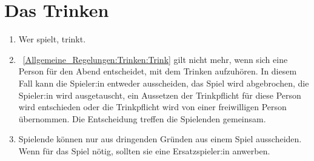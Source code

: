 \section{Das Trinken}
\begin{enumerate}[label={(\arabic*)}]
	\item\label{Allgemeine_Regelungen:Trinken:Trink}
	Wer spielt, trinkt.
	
	\item
~\ref{Allgemeine_Regelungen:Trinken:Trink} gilt nicht mehr, wenn sich eine Person für den Abend entscheidet, mit dem Trinken aufzuhören.
	In diesem Fall kann die Spieler:in entweder ausscheiden, das Spiel wird abgebrochen, die Spieler:in wird ausgetauscht,
	ein Aussetzen der Trinkpflicht für diese Person wird entschieden oder die Trinkpflicht wird von einer freiwilligen Person übernommen.
	Die Entscheidung treffen die Spielenden gemeinsam.
	
	\item
	Spielende können nur aus dringenden Gründen aus einem Spiel ausscheiden.
	Wenn für das Spiel nötig, sollten sie eine Ersatzspieler:in anwerben.
\end{enumerate}

